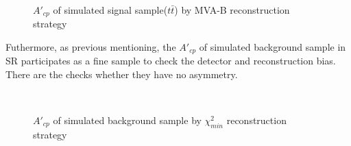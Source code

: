 		\begin{figure}[H]
			\centering
				\\
		\caption{$A'_{cp}$ of simulated signal sample($t\bar{t}$) by MVA-B reconstruction strategy}
		\label{AsymBias:fig:a05_noMlbcut_sim_tt_A'cp}
		\end{figure}
		\FloatBarrier


		Futhermore, as previous mentioning, the $A'_{cp}$ of simulated background sample in SR participates as a fine sample to check the detector and reconstruction bias. There are the checks whether they have no asymmetry.

		\begin{figure}[H]
			\centering
				\\
		\caption{$A'_{cp}$ of simulated background sample by $\chi^2_{min}$ reconstruction strategy}
		\label{AsymBias:fig:chi2_sim_bkg_A'cp}
		\end{figure}
		\FloatBarrier

